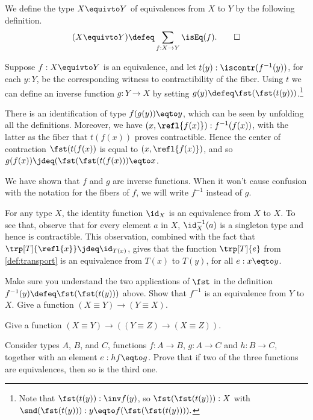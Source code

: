 \begin{definition}
  \label{def:type-of-equivalences}
  We define the type $X \equivto Y$ of equivalences from $X$ to $Y$ by the following definition.
  \[
  (X \equivto Y) \defeq \sum_{f:X\to Y} \isEq(f).\qedhere
  \]
\end{definition}

Suppose $f:X \equivto Y$ is an equivalence, and let $t(y): \iscontr(f^{-1}(y))$, for each $y:Y$, be the corresponding witness to contractibility of the fiber.
Using $t$ we can define an inverse function $g : Y \to X$ by setting $g(y)\defeq\fst(\fst(t(y)))$.\footnote{%
  Note that $\fst(t(y)) : \inv f(y)$, so $\fst(\fst(t(y))) : X$ with
  $\snd(\fst(t(y))) : y \eqto f(\fst(\fst(t(y)))).$}

There is an identification of type $f(g(y)) \eqto y$, which can be seen by unfolding all the definitions.
Moreover, we have $(x,\refl{f(x)}) : f^{-1}(f(x))$,
with the latter as the fiber that $t(f(x))$
proves contractible. Hence the center of contraction
$\fst(t(f(x))$ is equal to $(x,\refl{f(x)})$, and so
$g(f(x))\jdeq(\fst(\fst(t(f(x))) \eqto x$.

We have shown that $f$ and $g$ are inverse functions.  When it won't cause confusion with the notation for the fibers of $f$, we will write
$f^{-1}$ instead of $g$.

For any type $X$, the identity function $\id_X$ is an
equivalence from $X$ to $X$.  To see that, observe that for every element $a$ in $X$,
$\id_X^{-1}(a)$ is a singleton type and hence is contractible.
This observation, combined with the fact that
$\trp[T]{\refl{x}}\jdeq \id_{T(x)}$, gives that
the function $\trp[T]{e}$ from \cref{def:transport}
is an equivalence from $T(x)$ to $T(y)$, for all $e: x \eqto y$.

\begin{xca}\label{xca:equivalence-invers}
Make sure you understand the two applications of $\fst$
in the definition $f^{-1}(y)\defeq\fst(\fst(t(y)))$ above.
Show that $f^{-1}$ is an equivalence from $Y$ to $X$.
Give a function $(X\equiv Y) \to (Y\equiv X)$.
\end{xca}

\begin{xca}\label{xca:equivalence-comp}
Give  a function $(X\equiv Y) \to ((Y\equiv Z) \to (X\equiv Z))$.
\end{xca}

\begin{xca}\label{xca:2-out-of-3}
  Consider types $A$, $B$, and $C$, functions $f:A\to B$, $g:A\to C$ and $h:B\to C$, together with an element $e: hf \eqto g$.  Prove that if two of
  the three functions are equivalences, then so is the third one.
\end{xca}

